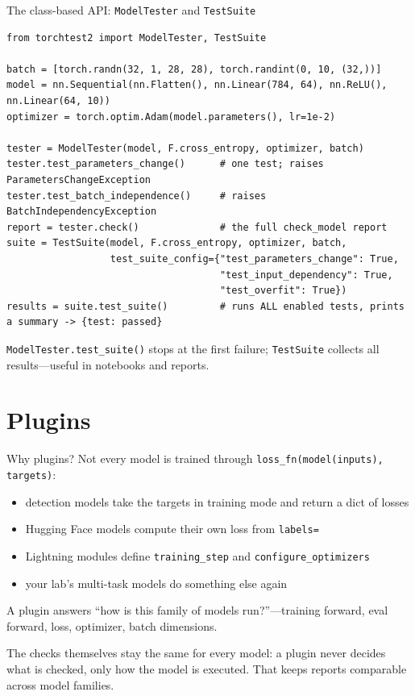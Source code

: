 \documentclass[aspectratio=169,11pt]{beamer}
\begin{document}
\begin{frame}[fragile]{The class-based API: \texttt{ModelTester} and \texttt{TestSuite}}
  \begin{lstlisting}
from torchtest2 import ModelTester, TestSuite

batch = [torch.randn(32, 1, 28, 28), torch.randint(0, 10, (32,))]
model = nn.Sequential(nn.Flatten(), nn.Linear(784, 64), nn.ReLU(), nn.Linear(64, 10))
optimizer = torch.optim.Adam(model.parameters(), lr=1e-2)

tester = ModelTester(model, F.cross_entropy, optimizer, batch)
tester.test_parameters_change()      # one test; raises ParametersChangeException
tester.test_batch_independence()     # raises BatchIndependencyException
report = tester.check()              # the full check_model report
suite = TestSuite(model, F.cross_entropy, optimizer, batch,
                  test_suite_config={"test_parameters_change": True,
                                     "test_input_dependency": True,
                                     "test_overfit": True})
results = suite.test_suite()         # runs ALL enabled tests, prints a summary -> {test: passed}
  \end{lstlisting}
  \small \texttt{ModelTester.test\_suite()} stops at the first failure; \texttt{TestSuite}
  collects all results---useful in notebooks and reports.
\end{frame}

\section{Plugins}

\begin{frame}{Why plugins?}
  Not every model is trained through \texttt{loss\_fn(model(inputs), targets)}:
  \begin{itemize}
    \item \alert{detection models} take the targets in training mode and return a dict of losses
    \item \alert{Hugging Face} models compute their own loss from \texttt{labels=}
    \item \alert{Lightning} modules define \texttt{training\_step} and
          \texttt{configure\_optimizers}
    \item your lab's multi-task models do something else again
  \end{itemize}
  \medskip
  A plugin answers \alert{``how is this family of models run?''}---training forward, eval
  forward, loss, optimizer, batch dimensions.
  \medskip

  The checks themselves stay \alert{the same for every model}: a plugin never decides what is
  checked, only how the model is executed. That keeps reports comparable across model families.
\end{frame}
\end{document}
